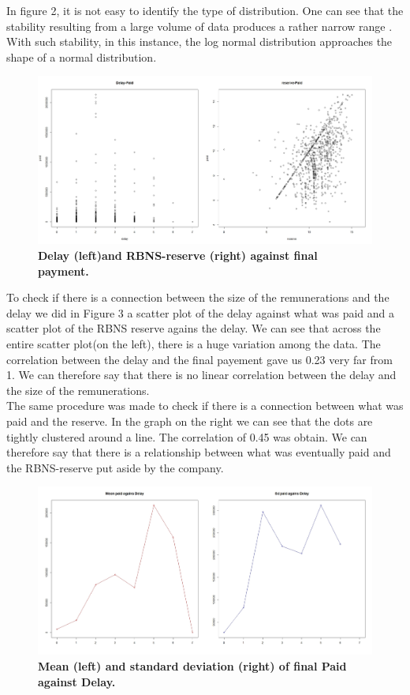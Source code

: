 \documentclass[a4paper]{article}
\begin{document}
In figure 2, it is not easy to identify the type of distribution. One can see that the stability resulting from a large volume of data produces a rather narrow range . With such stability, in this instance, the log normal distribution approaches the shape of a normal distribution.


\begin{figure}[h]
  \centering
  \includegraphics[scale=0.2]{Delay_pay_par_reser_paid.jpeg}
  \caption{\textbf{Delay (left)and RBNS-reserve (right) against final payment.}}
\end{figure}


\newpage

To check if there is a connection between the size of the remunerations and the delay we did in  Figure 3 a scatter plot of the delay against what was paid and a scatter plot of the RBNS reserve agains the delay. We can see that across the entire scatter plot(on the left), there is a huge variation among the data. 
The correlation between the delay and the final payement gave us 0.23 very far from 1. We can therefore say that there is no linear correlation between the delay and the size of the remunerations.\\

The same procedure was made to check if there is a connection between what was paid and the reserve. In the graph on the right we can see that the dots are tightly clustered around a line. The correlation of 0.45 was obtain. We can therefore say that there is a relationship between what was eventually paid and the RBNS-reserve put aside by the company.\\



\begin{figure}[h]
  \centering
  \includegraphics[scale=0.2]{par_Mean_sd_paid_delay.jpeg}
  \caption{\textbf{Mean (left) and standard deviation (right) of final Paid against Delay.}}
\end{figure}
\end{document}

